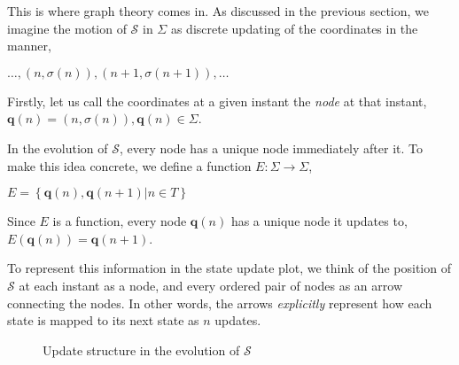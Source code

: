 \documentclass[12 pt]{article}
\begin{document}
This is where graph theory comes in. As discussed in the previous section, we imagine the motion of $\mathcal{S}$ in $\Sigma$ as discrete updating of the coordinates in the manner,

$\dots, \left( n, \sigma \left( n \right) \right), \left( n+1, \sigma \left( n+1 \right) \right), \dots$

Firstly, let us call the coordinates at a given instant the \emph{node} at that instant, $\pmb{q} \left( n \right) = \left( n, \sigma \left( n \right) \right), \pmb{q} \left( n \right) \in \Sigma$.

In the evolution of $\mathcal{S}$, every node has a unique node immediately after it. To make this idea concrete, we define a function $E : \Sigma \rightarrow \Sigma$,

$E = \left\{ \pmb{q} \left( n \right), \pmb{q} \left( n+1 \right) \vert n \in T \right\}$

Since $E$ is a function, every node $\pmb{q} \left( n \right)$ has a unique node it updates to, $E \left( \pmb{q} \left( n \right) \right) = \pmb{q} \left( n+1 \right)$.

To represent this information in the state update plot, we think of the position of $\mathcal{S}$ at each instant as a node, and every ordered pair of nodes as an arrow connecting the nodes. In other words, the arrows \emph{explicitly} represent how each state is mapped to its next state as $n$ updates.

\clearpage

\begin{figure}[h]
\label{fig:2}
\centering
{}
\caption{Update structure in the evolution of $\mathcal{S}$}
\end{figure}
\end{document}
